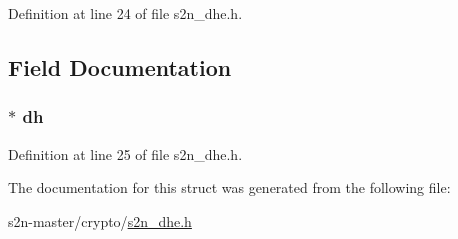 Definition at line 24 of file s2n\+\_\+dhe.\+h.



\subsection{Field Documentation}
\subsubsection[{\texorpdfstring{dh}{dh}}]{$\ast$ dh}\hypertarget{structs2n__dh__params_a29d3a6b30f8ddddfe73007d3611b3de8}{}\label{structs2n__dh__params_a29d3a6b30f8ddddfe73007d3611b3de8}


Definition at line 25 of file s2n\+\_\+dhe.\+h.



The documentation for this struct was generated from the following file\+:\begin{DoxyCompactItemize}
\item 
s2n-\/master/crypto/\hyperlink{s2n__dhe_8h}{s2n\+\_\+dhe.\+h}\end{DoxyCompactItemize}
